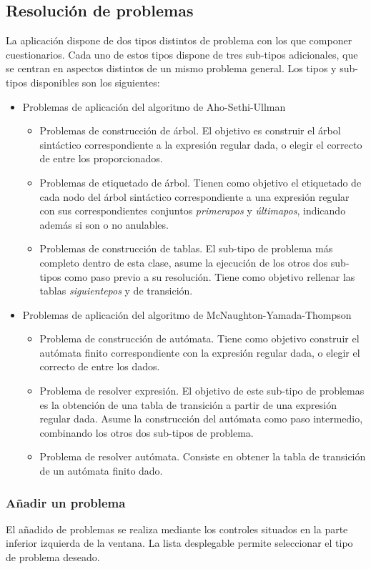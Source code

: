 \subsection{Resolución de problemas}
La aplicación dispone de dos tipos distintos de problema con los que componer cuestionarios.
Cada uno de estos tipos dispone de tres sub-tipos adicionales, que se centran en aspectos distintos de un mismo problema general.
Los tipos y sub-tipos disponibles son los siguientes:
\begin{itemize}
	\item Problemas de aplicación del algoritmo de Aho-Sethi-Ullman
	\begin{itemize}
		\item Problemas de construcción de árbol.
		El objetivo es construir el árbol sintáctico correspondiente a la expresión regular dada, o elegir el correcto de entre los proporcionados.
		\item Problemas de etiquetado de árbol.
		Tienen como objetivo el etiquetado de cada nodo del árbol sintáctico correspondiente a una expresión regular con sus correspondientes conjuntos \emph{primerapos} y \emph{últimapos}, indicando además si son o no anulables.
		\item Problemas de construcción de tablas.
		El sub-tipo de problema más completo dentro de esta clase, asume la ejecución de los otros dos sub-tipos como paso previo a su resolución.
		Tiene como objetivo rellenar las tablas \emph{siguientepos} y de transición.
	\end{itemize}
	\item Problemas de aplicación del algoritmo de McNaughton-Yamada-Thompson
	\begin{itemize}
		\item Problema de construcción de autómata.
		Tiene como objetivo construir el autómata finito correspondiente con la expresión regular dada, o elegir el correcto de entre los dados.
		\item Problema de resolver expresión.
		El objetivo de este sub-tipo de problemas es la obtención de una tabla de transición a partir de una expresión regular dada.
		Asume la construcción del autómata como paso intermedio, combinando los otros dos sub-tipos de problema.
		\item Problema de resolver autómata.
		Consiste en obtener la tabla de transición de un autómata finito dado.
	\end{itemize}
\end{itemize}

\subsubsection{Añadir un problema}
El añadido de problemas se realiza mediante los controles situados en la parte inferior izquierda de la ventana.
La lista desplegable permite seleccionar el tipo de problema deseado.

